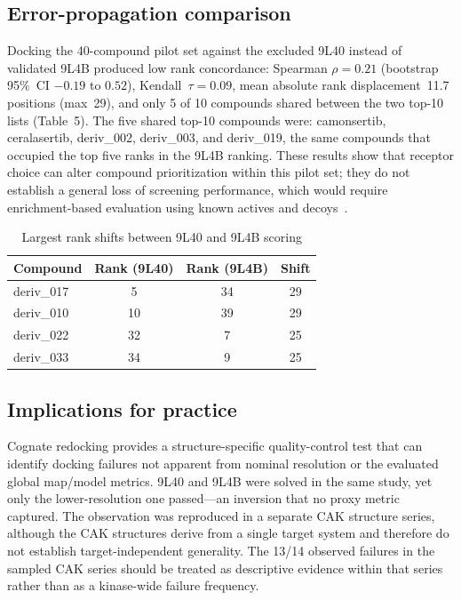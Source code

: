 \documentclass[global,twocolumn]{svjour}
\newcommand{\st}{\footnotesize\setlength{\tabcolsep}{3pt}}
\begin{document}
\subsection{Error-propagation comparison}

Docking the 40-compound pilot set against the excluded 9L40 instead of
validated 9L4B produced low rank concordance: Spearman $\rho=0.21$ (bootstrap
95\%~CI $-0.19$ to $0.52$), Kendall~$\tau=0.09$, mean absolute rank
displacement~11.7 positions (max~29), and only 5 of 10 compounds shared
between the two top-10 lists (Table~5). The five shared top-10 compounds
were: camonsertib, ceralasertib, deriv\_002, deriv\_003, and deriv\_019, the
same compounds that occupied the top five ranks in the 9L4B ranking. These
results show that receptor choice can alter compound prioritization within
this pilot set; they do not establish a general loss of screening
performance, which would require enrichment-based evaluation using known
actives and decoys~\cite{thygesen2022,huang2006}.

\begin{table}[t]
\centering
\caption{Largest rank shifts between 9L40 and 9L4B scoring}
\label{tab:errorprop}
\st
\begin{tabular}{lccc}
\toprule
Compound & Rank (9L40) & Rank (9L4B) & Shift \\
\midrule
deriv\_017 & 5  & 34 & 29 \\
deriv\_010 & 10 & 39 & 29 \\
deriv\_022 & 32 & 7  & 25 \\
deriv\_033 & 34 & 9  & 25 \\
\bottomrule
\end{tabular}
\end{table}

\subsection{Implications for practice}

Cognate redocking provides a structure-specific quality-control test that can
identify docking failures not apparent from nominal resolution or the
evaluated global map/model metrics. 9L40 and 9L4B were solved in the same
study, yet only the lower-resolution one passed---an inversion that no proxy
metric captured. The observation was reproduced in a separate CAK structure
series, although the CAK structures derive from a single target system and
therefore do not establish target-independent generality. The 13/14 observed
failures in the sampled CAK series should be treated as descriptive evidence
within that series rather than as a kinase-wide failure frequency.
\end{document}
